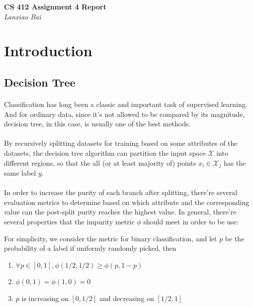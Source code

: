 \documentclass[11pt]{article}
\begin{document}
	\begin{center}
      \Large\textbf{CS 412 Assignment 4 Report}\\
      \large\textit{Lanxiao Bai}
   \end{center}
   
   \section{Introduction}
   \subsection{Decision Tree}
   \paragraph{}
    	Classification has long been a classic and important task of supervised learning. And for ordinary data, since it's not allowed to be compared by its magnitude, decision tree, in this case, is usually one of the best methods.
    	
    \paragraph{}
    	By recursively splitting datasets for training based on some attributes of the datasets, the decision tree algorithm can partition the input space $\mathcal{X}$ into different regions, so that the all (or at least majority of) points $x_i \in \mathcal{X}_j$ has the same label $y$.
    	
    \paragraph{}
    	In order to increase the purity of each branch after splitting, there're several evaluation metrics to determine based on which attribute and the corresponding value can the post-split purity reaches the highest value. In general, there're several properties that the impurity metric $\phi$ should meet in order to be use:
    	
    	For simplicity, we consider the metric for binary classification, and let $p$ be the probability of a label if uniformly randomly picked, then
    	
    	\begin{enumerate}
    		\item $\forall p \in [0, 1], \phi(1/2, 1/2) \geq \phi(p, 1 - p)$
    		\item $\phi(0, 1) = \phi(1, 0) = 0$
    		\item $p$ is increasing on $[0, 1/2]$ and decreasing on $[1/2, 1]$
    	\end{enumerate}
    
\end{document}
